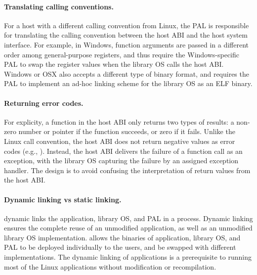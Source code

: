 



\paragraph{Translating calling conventions.}
For a host with a different calling convention from Linux,
the PAL is responsible for translating the calling convention between the host ABI and the host system interface.
For example,
in Windows, function arguments are passed in a different order among general-purpose registers,
and thus require the Windows-specific PAL
to swap the register values when the library OS calls the host ABI.
Windows or OSX also accepts a different type of binary format,
and requires the PAL to implement an ad-hoc linking scheme for the library OS as an ELF binary.




\paragraph{Returning error codes.}
For explicity, a function in the host ABI only returns two types of results:
a non-zero number or pointer if the function succeeds, or zero if it fails.
Unlike the Linux call convention, the host ABI does not return negative values as error codes (e.g., ).
Instead, the host ABI delivers the failure of a function call
as an exception, with the library OS capturing the failure by an assigned exception handler.
The design is to avoid confusing
the interpretation of return values from the host ABI.



\paragraph{Dynamic linking vs static linking.}
\graphene{} dynamic links the application, library OS, and PAL
in a process.
Dynamic linking ensures the complete reuse of an unmodified application,
as well as an unmodified library OS implementation.
\graphene{} allows the binaries of application, library OS, and PAL to be deployed individually to the users,
and be swapped with different implementations.
The dynamic linking of applications is a prerequisite
to running most of the Linux applications without modification or recompilation.



